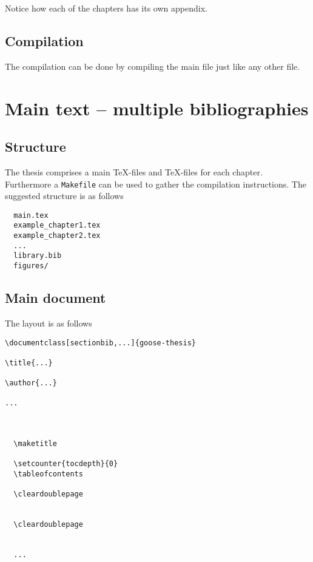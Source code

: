 Notice how each of the chapters has its own appendix.

\subsection{Compilation}

The compilation can be done by compiling the main file just like any other file.

\section{Main text -- multiple bibliographies}
\label{sec:sectionbib}

\subsection{Structure}

The thesis comprises a main \TeX-files and \TeX-files for each chapter. Furthermore a \texttt{Makefile} can be used to gather the compilation instructions. The suggested structure is as follows
%
\begin{verbatim}
  main.tex
  example_chapter1.tex
  example_chapter2.tex
  ...
  library.bib
  figures/
\end{verbatim}
%

\subsection{Main document}

The layout is as follows
\begin{mdframed}
\begin{verbatim}
\documentclass[sectionbib,...]{goose-thesis}

\title{...}

\author{...}

...



  \maketitle

  \setcounter{tocdepth}{0}
  \tableofcontents

  \cleardoublepage
  

  \cleardoublepage
  

  ...


\end{verbatim}
\end{mdframed}

